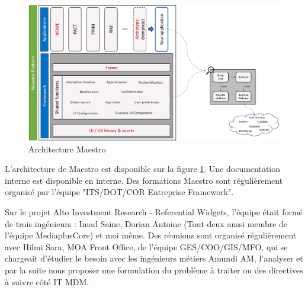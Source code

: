 \begin{figure}[ht]
    \centering
    \includegraphics[width=\columnwidth]{img/Maestro.png}
    \caption{Architecture Maestro}
    \label{fig:archMaestro}
\end{figure}

\par L'architecture de Maestro est disponible sur la figure \ref{fig:archMaestro}. Une documentation interne est disponible en interne. Des formations Maestro sont régulièrement organisé par l'équipe "ITS/DOT/COR Entreprise Framework".
\par Sur le projet Alto Investment Research - Referential Widgets, l'équipe était formé de trois ingénieurs : Imad Saine, Dorian Antoine (Tout deux aussi membre de l'équipe MediaplusCore) et moi même. Des réunions sont organisé régulièrement avec Hilmi Sara, MOA Front Office, de l'équipe GES/COO/GIS/MFO, qui se chargeait d'étudier le besoin avec les ingénieurs métiers Amundi AM, l'analyser et par la suite nous proposer une formulation du problème à traiter ou des directives à suivre côté IT MDM.